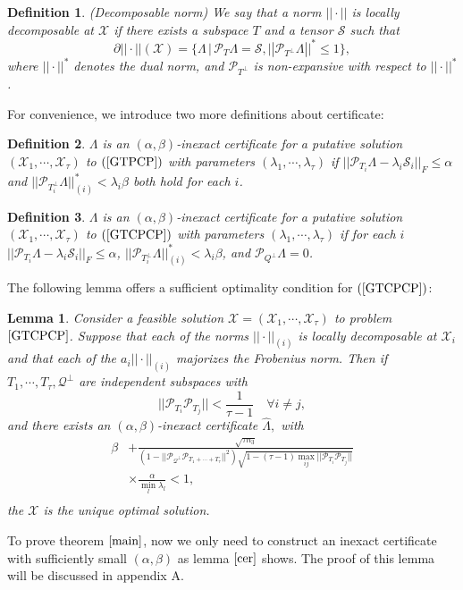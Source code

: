 \documentclass[journal,transmag]{IEEEtran}
\newtheorem{definition}{Definition}[section]
\newtheorem{lemma}{Lemma}[section]
\theoremstyle{plain}
\begin{document}
\begin{definition} (Decomposable norm) We say that a norm $||\cdot||$ is locally decomposable at $\mathcal{X}$ if there exists a subspace $T$ and a tensor $\mathcal{S}$ such that \[\partial ||\cdot||(\mathcal{X})=\{\Lambda \,|\, \mathcal{P}_T \Lambda =\mathcal{S}, ||\mathcal{P}_{T^{\bot}}\Lambda||^* \le 1\},\]
where $||\cdot||^*$ denotes the dual norm, and $\mathcal{P}_{T^{\bot}}$ is non-expansive with respect to $||\cdot||^*$.
\end{definition}
For convenience, we introduce two more definitions about certificate:
\begin{definition}
$\Lambda$ is an $(\alpha,\beta)$-inexact certificate for a putative solution $(\mathcal{X}_1,\cdots,\mathcal{X}_{\tau})$ to $(\ref{GTPCP})$ with parameters $(\lambda_1,\cdots,\lambda_{\tau})$ if $||\mathcal{P}_{T_i}\Lambda-\lambda_i \mathcal{S}_i||_F\le \alpha$ and $||\mathcal{P}_{T_i^{\bot}}\Lambda||^*_{(i)}<\lambda_i \beta$ both hold for each $i$.
\end{definition}
\begin{definition}
$\Lambda$ is an $(\alpha,\beta)$-inexact certificate for a putative solution $(\mathcal{X}_1,\cdots,\mathcal{X}_{\tau})$ to $(\ref{GTCPCP})$ with parameters $(\lambda_1,\cdots,\lambda_{\tau})$ if for each $i$ $||\mathcal{P}_{T_i}\Lambda-\lambda_i \mathcal{S}_i||_F\le \alpha$, $||\mathcal{P}_{T_i^{\bot}}\Lambda||^*_{(i)}<\lambda_i \beta$, and $\mathcal{P}_{Q^{\bot}}\Lambda=0$.
\end{definition}
The following lemma offers a sufficient optimality condition for $(\ref{GTCPCP})$:
\begin{lemma} \label{cer}
Consider a feasible solution $\mathcal{X}=(\mathcal{X}_1,\cdots, \mathcal{X}_{\tau})$ to problem $\ref{GTCPCP}$. Suppose that each of the norms $||\cdot||_{(i)}$ is locally decomposable at $\mathcal{X}_i$ and that each of the $a_i ||\cdot||_{(i)}$ majorizes the Frobenius norm. Then if $T_1,\cdots,T_{\tau},\mathcal{Q}^{\bot}$ are independent subspaces with
\begin{equation}
{||\mathcal{P}_{T_i}\mathcal{P}_{T_j}||<\frac{1}{\tau-1} \quad \forall i\not= j,}
\end{equation}
and there exists an $(\alpha,\beta)$-inexact certificate $\hat{\Lambda},$ with
\begin{equation}
\begin{split}
\beta &+ \frac{\sqrt{\tau n_3}}{(1-||\mathcal{P}_{\mathcal{Q}^{\bot}}\mathcal{P}_{T_1+\cdots+T_{\tau}}||^2)\sqrt{1-(\tau-1)\max_{ij}||\mathcal{P}_{T_i}\mathcal{P}_{T_j}||}}\\
&\times \frac{\alpha}{\min_l \lambda_l}<1,\\
\end{split}
\end{equation}
the $\mathcal{X}$ is the unique optimal solution.
\end{lemma}
To prove theorem $\ref{main}$, now we only need to construct an inexact certificate with sufficiently small $(\alpha,\beta)$ as lemma $\ref{cer}$ shows. The proof of this lemma will be discussed in appendix A.
\end{document}

